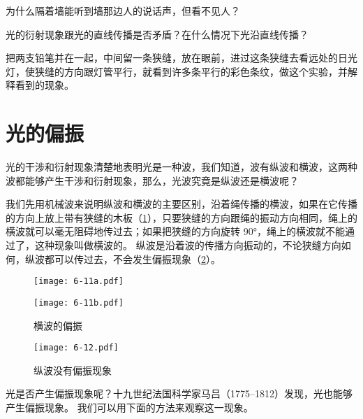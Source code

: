 \begin{Practice}
\begin{question}
  \item 为什么隔着墙能听到墙那边人的说话声，但看不见人？
  \item 光的衍射现象跟光的直线传播是否矛盾？在什么情况下光沿直线传播？
  \item 把两支铅笔并在一起，中间留一条狭缝，放在眼前，进过这条狭缝去看远处的日光灯，使狭缝的方向跟灯管平行，就看到许多条平行的彩色条纹，做这个实验，并解释看到的现象。
\end{question}
\end{Practice}

\section{光的偏振}
光的干涉和衍射现象清楚地表明光是一种波，我们知道，波有纵波和横波，这两种波都能够产生干涉和衍射现象，那么，光波究竟是纵波还是横波呢？

我们先用机械波来说明纵波和横波的主要区别，沿着绳传播的横波，如果在它传播的方向上放上带有狭缝的木板（\cref{fig:6-11}），只要狭缝的方向跟绳的振动方向相同，绳上的横波就可以毫无阻碍地传过去；如果把狭缝的方向旋转 \ang{90}，绳上的横波就不能通过了，这种现象叫做横波的。
纵波是沿着波的传播方向振动的，不论狭缝方向如何，纵波都可以传过去，不会发生偏振现象（\cref{fig:6-12}）。
\begin{figure}
  \begin{minipage}[b]{0.48\linewidth}\centering
    \texttt{[image: 6-11a.pdf]}
    \subcaption{}\label{fig:6-11a}
  \end{minipage}
  \begin{minipage}[b]{0.48\linewidth}\centering
    \texttt{[image: 6-11b.pdf]}
    \subcaption{}\label{fig:6-11b}
  \end{minipage}
  \caption{横波的偏振}\label{fig:6-11}
\end{figure}
\begin{figure}
  \texttt{[image: 6-12.pdf]}
  \caption{纵波没有偏振现象}\label{fig:6-12}
\end{figure}

光是否产生偏振现象呢？十九世纪法国科学家马吕（1775--1812）发现，光也能够产生偏振现象。
我们可以用下面的方法来观察这一现象。

